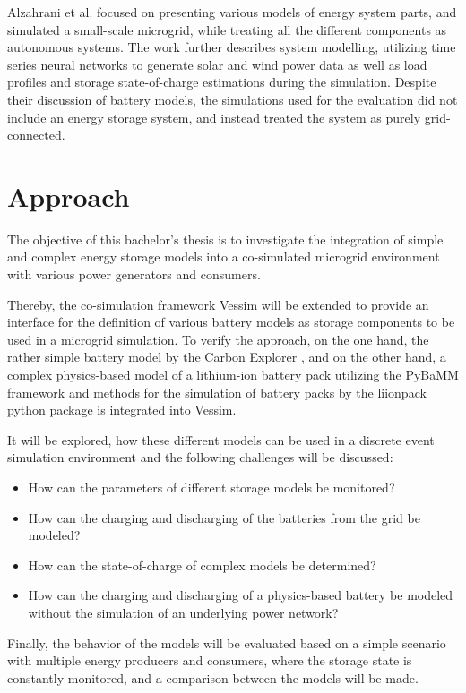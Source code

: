 \documentclass[11pt, a4paper]{report}
\begin{document}
Alzahrani et al. \cite{alzahrani2017modeling} focused on presenting various models of energy system parts, and simulated a small-scale microgrid, while treating all the different components as autonomous systems. The work further describes system modelling, utilizing time series neural networks to generate solar and wind power data as well as load profiles and storage state-of-charge estimations during the simulation. Despite their discussion of battery models, the simulations used for the evaluation did not include an energy storage system, and instead treated the system as purely grid-connected.

\section*{Approach}
The objective of this bachelor's thesis is to investigate the integration of simple and complex energy storage models into a co-simulated microgrid environment with various power generators and consumers.

Thereby, the co-simulation framework Vessim \cite{wiesner2023testbed} will be extended to provide an interface for the definition of various battery models as storage components to be used in a microgrid simulation. To verify the approach, on the one hand, the rather simple battery model by the Carbon Explorer \cite{acun2022holistic}, and on the other hand, a complex physics-based model of a lithium-ion battery pack utilizing the PyBaMM framework \cite{pybammbatteries} and methods for the simulation of battery packs by the liionpack python package \cite{tranter2022liionpack} is integrated into Vessim.

It will be explored, how these different models can be used in a discrete event simulation environment and the following challenges will be discussed:
\begin{itemize}
    \item How can the parameters of different storage models be monitored?
    \item How can the charging and discharging of the batteries from the grid be modeled?
    \item How can the state-of-charge of complex models be determined? 
    \item How can the charging and discharging of a physics-based battery be modeled without the simulation of an underlying power network?
\end{itemize}

Finally, the behavior of the models will be evaluated based on a simple scenario with multiple energy producers and consumers, where the storage state is constantly monitored, and a comparison between the models will be made.
\end{document}
